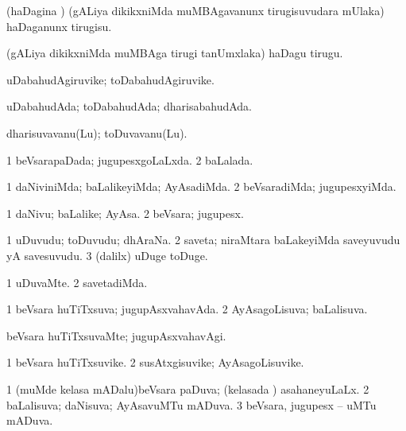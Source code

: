 \bentry
{} 
\gl{\sakirx}
\bmng
(haDagina \vi) (gALiya dikikxniMda muMBAgavanunx tirugisuvudara mUlaka) haDaganunx tirugisu. 
\emng

\noindent 
\gl{\akirx}
\expl{}
\bmng
(gALiya dikikxniMda muMBAga tirugi tanUmxlaka) haDagu tirugu. 
\emng
\eentry

\bentry
{} 
\gl{\nA}
\expl{}
\bmng
uDabahudAgiruvike; toDabahudAgiruvike. 
\emng
\eentry

\bentry
{} 
\gl{\gu}
\expl{}
\bmng
uDabahudAda; toDabahudAda; dharisabahudAda. 
\emng
\eentry

\bentry
{} 
\gl{\nA}
\expl{}
\bmng
dharisuvavanu(Lu); toDuvavanu(Lu). 
\emng
\eentry

\bentry
{} 
\gl{\gu}
\expl{}
\bmng
\bnum
\num{1} beVsarapaDada; jugupesxgoLaLxda. 
\num{2} baLalada. 
\enum
\emng
\eentry

\bentry
{} 
\gl{\kirxvi}
\expl{}
\bmng
\bnum
\num{1} daNiviniMda; baLalikeyiMda; AyAsadiMda. 
\num{2} beVsaradiMda; jugupesxyiMda. 
\enum
\emng
\eentry

\bentry
{} 
\gl{\nA}
\expl{}
\bmng
\bnum
\num{1} daNivu; baLalike; AyAsa. 
\num{2} beVsara; jugupesx. 
\enum
\emng
\eentry

\bentry
{} 
\gl{\nA}
\expl{}
\bmng
\bnum
\num{1} uDuvudu; toDuvudu; dhAraNa. 
\num{2} saveta; niraMtara baLakeyiMda saveyuvudu yA savesuvudu. 
\num{3} (\bava dalilx) uDuge toDuge. 
\enum
\emng
\eentry

\bentry
{} 
\gl{\kirxvi}
\expl{}
\bmng
\bnum
\num{1} uDuvaMte. 
\num{2} savetadiMda. 
\enum
\emng
\eentry

\bentry
{} 
\gl{\gu}
\expl{}
\bmng
\bnum
\num{1} beVsara huTiTxsuva; jugupAsxvahavAda. 
\num{2} AyAsagoLisuva; baLalisuva. 
\enum
\emng
\eentry

\bentry
{} 
\gl{\kirxvi}
\expl{}
\bmng
beVsara huTiTxsuvaMte; jugupAsxvahavAgi. 
\emng
\eentry

\bentry
{} 
\gl{\nA}
\bmng
\bnum
\num{1} beVsara huTiTxsuvike. 
\num{2} susAtxgisuvike; AyAsagoLisuvike. 
\enum
\emng
\eentry

\bentry
{} 
\gl{\gu}
\bmng
\bnum
\num{1} (muMde kelasa mADalu)beVsara paDuva; (kelasada \vi) asahaneyuLaLx. 
\num{2} baLalisuva; daNisuva; AyAsavuMTu mADuva. 
\num{3} beVsara, jugupesx -- uMTu mADuva. 
\enum
\emng
\eentry

